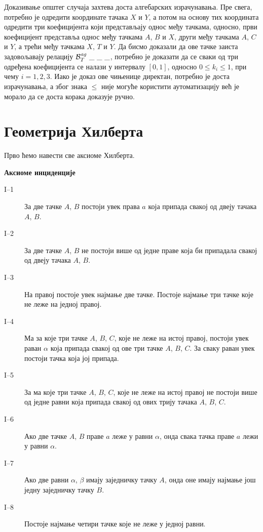 Доказивање општег случаја захтева доста алгебарских израчунавања. Пре
свега, потребно је одредити координате тачака $X$ и $Y$, а потом на
основу тих координата одредити три коефицијента који представљају
однос међу тачкама, односно, први коефицијент представља однос међу
тачкама $A$, $B$ и $X$, други међу тачкама $A$, $C$ и $Y$, а трећи
међу тачкама $X$, $T$ и $Y$. Да бисмо доказали да ове тачке заиста
задовољавају релацију $\mathcal{B}_T^{\mathit{ag}}\ \_\ \_\ \_$, потребно је доказати да
се сваки од три одређена коефицијента се налази у интервалу $[0, 1]$,
односно $0 \le k_i \le 1$, при чему $i = 1, 2, 3$. Иако је доказ ове
чињенице директан, потребно је доста израчунавања, а због знака $\le$
није могуће користити аутоматизацију већ је морало да се доста корака
доказује ручно.

\newpage

\section{Геометрија Хилберта}
\label{sec:hilbert}

Прво ћемо навести све аксиоме Хилберта.

\noindent \textbf{Аксиоме инциденције}
\begin{description}
\item[I--1] За две тачке $A$, $B$ постоји увек права $a$ која припада
  свакој од двеју тачака $A$, $B$.
\item[I--2] За две тачке $A$, $B$ не постоји више од једне праве која
  би припадала свакој од двеју тачака $A$, $B$.
\item[I--3] На правој постоје увек најмање две тачке. Постоје најмање
  три тачке које не леже на једној правој.
\item[I--4] Ма за које три тачке $A$, $B$, $C$, које не леже на истој
  правој, постоји увек раван $\alpha$ која припада свакој од ове три
  тачке $A$, $B$, $C$. За сваку раван увек постоји тачка која јој
  припада.
\item[I--5] За ма које три тачке $A$, $B$, $C$, које не леже на истој
  правој не постоји више од једне равни која припада свакој од ових
  трију тачака $A$, $B$, $C$.
\item[I--6] Ако две тачке $A$, $B$ праве $a$ леже у равни $\alpha$,
  онда свака тачка праве $a$ лежи у равни $\alpha$.
\item[I--7] Ако две равни $\alpha$, $\beta$ имају заједничку тачку
  $A$, онда оне имају најмање још једну заједничку тачку $B$.
\item[I--8] Постоје најмање четири тачке које не леже у једној равни.
\end{description}

